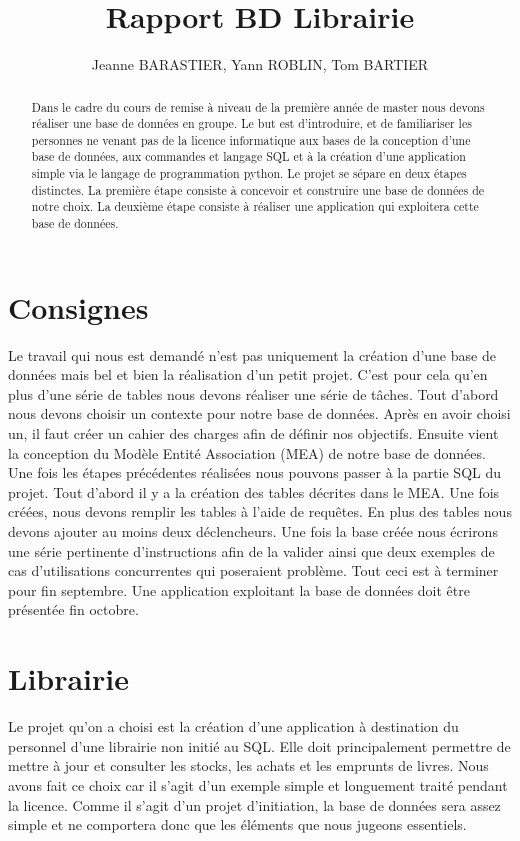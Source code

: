 \documentclass[10pt,a4paper,parskip=full*,DIV=11]{scrartcl}
\title{Rapport BD Librairie}
\author{Jeanne BARASTIER, Yann ROBLIN, Tom BARTIER}
\begin{document}
\maketitle
\begin{abstract}
    Dans le cadre du cours de remise à niveau de la première année de master nous devons réaliser une base de données en groupe. Le but est d’introduire, et de familiariser 
    les personnes ne venant pas de la licence informatique aux bases de la conception d’une base de données, 
    aux commandes et langage SQL et à la création d’une application simple via le langage de programmation python. 
    Le projet se sépare en deux étapes distinctes. La première étape consiste à concevoir et construire une base de 
    données de notre choix. La deuxième étape consiste à réaliser une application qui exploitera cette base de données.
\end{abstract}

\newpage
\tableofcontents
\newpage

\section{Consignes}
Le travail qui nous est demandé n’est pas uniquement la création d’une base de 
données mais bel et bien la réalisation d’un petit projet. C’est pour cela qu’en 
plus d’une série de tables nous devons réaliser une série de tâches. Tout d’abord nous 
devons choisir un contexte pour notre base de données. Après en avoir choisi un, il faut
 créer un cahier des charges afin de définir nos objectifs. Ensuite vient la conception
  du Modèle Entité Association (MEA) de notre base de données. Une fois les étapes 
  précédentes réalisées nous pouvons passer à la partie SQL du projet. Tout d’abord il 
  y a la création des tables décrites dans le MEA. Une fois créées, nous devons remplir
   les tables à l’aide de requêtes. En plus des tables nous devons ajouter au moins deux
    déclencheurs. Une fois la base créée nous écrirons une série pertinente 
    d’instructions afin de la valider ainsi que deux exemples de cas d’utilisations 
    concurrentes qui poseraient problème. Tout ceci est à terminer pour fin septembre. 
Une application exploitant la base de données doit être présentée fin octobre.

\section{Librairie}
Le projet qu’on a choisi est la création d’une application à destination du personnel d’une librairie non initié au SQL. Elle doit principalement permettre de mettre à jour 
et consulter les stocks, les achats et les emprunts de livres. Nous avons fait ce choix car il s’agit d’un exemple simple et 
longuement traité pendant la licence. Comme il s’agit d’un projet d’initiation, la base de données sera assez simple et ne comportera donc que les éléments que nous jugeons essentiels.
\end{document}
